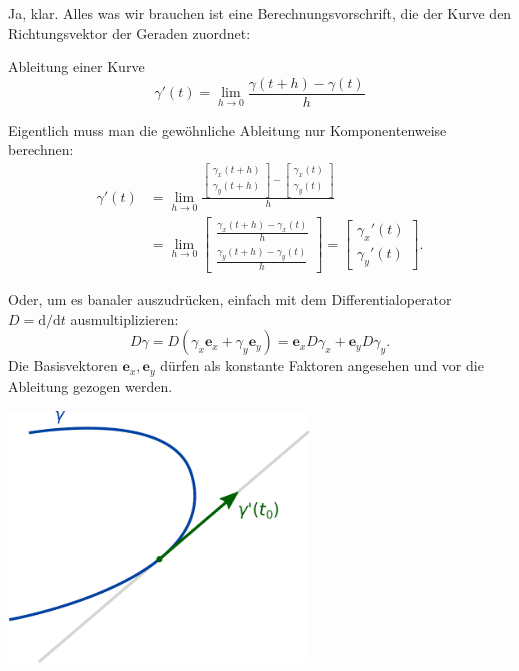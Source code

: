 \documentclass{beamer}
\begin{document}
\begin{frame}
Ja, klar. Alles was wir brauchen ist eine Berechnungsvorschrift,
die der Kurve den Richtungsvektor der Geraden zuordnet:
\begin{block}{Ableitung einer Kurve}
\[\gamma'(t) = \lim_{h\to 0}\frac{\gamma(t+h)-\gamma(t)}{h}\]
\end{block}
\end{frame}

\begin{frame}
Eigentlich muss man die gewöhnliche Ableitung nur Komponentenweise
berechnen:
\[\begin{aligned}\gamma'(t) &= \lim_{h\to 0} \frac{
\begin{bmatrix}\gamma_x(t+h)\\ \gamma_y(t+h)\end{bmatrix}
-\begin{bmatrix}\gamma_x(t)\\ \gamma_y(t)\end{bmatrix}}{h}\\
& = \lim_{h\to 0}
\begin{bmatrix}\frac{\gamma_x(t+h)-\gamma_x(t)}{h}\\
\frac{\gamma_y(t+h)-\gamma_y(t)}{h}\end{bmatrix}
= \begin{bmatrix}\gamma_x'(t)\\ \gamma_y'(t)\end{bmatrix}.
\end{aligned}\]
\end{frame}

\begin{frame}
Oder, um es banaler auszudrücken, einfach mit dem Differentialoperator
$D=\mathrm d/\mathrm dt$ ausmultiplizieren:
\[D\gamma = D(\gamma_x\mathbf e_x+\gamma_y\mathbf e_y)
= \mathbf e_x D\gamma_x+\mathbf e_y D\gamma_y.\]
Die Basisvektoren $\mathbf e_x,\mathbf e_y$ dürfen als konstante
Faktoren angesehen und vor die Ableitung gezogen werden.

\end{frame}

\begin{frame}
\begin{center}
\includegraphics[width=0.6\textwidth]{img/Tangentialvektor.pdf}
\end{center}
\end{frame}
\end{document}
